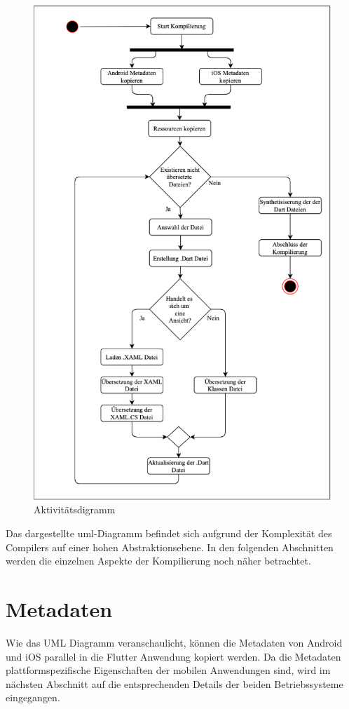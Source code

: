 \newpage
\begin{figure}[!ht]
 \includegraphics[width=\textwidth,keepaspectratio]{Images/Implementation/Ablauf.png}
 \caption{Aktivitätsdigramm}
 \label{fig:umlablauf}
\end{figure}

Das dargestellte \ac{uml}-Diagramm befindet sich aufgrund der Komplexität des Compilers auf einer hohen Abstraktionsebene. In den folgenden Abschnitten werden die einzelnen Aspekte der Kompilierung noch näher betrachtet.


\section{Metadaten}
Wie das UML Diagramm veranschaulicht, können die Metadaten von Android und iOS parallel in die Flutter Anwendung kopiert werden.  Da die Metadaten
plattformspezifische Eigenschaften der mobilen Anwendungen sind, wird im nächsten Abschnitt auf die entsprechenden Details der beiden Betriebssysteme eingegangen.


